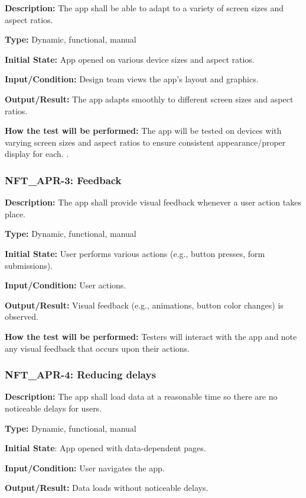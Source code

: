 \documentclass[12pt, titlepage]{article}
\begin{document}
\textbf{Description:} The app shall be able to adapt to a variety of screen sizes and aspect ratios.

\textbf{Type:} Dynamic, functional, manual

\textbf{Initial State:} App opened on various device sizes and aspect ratios.

\textbf{Input/Condition:} Design team views the app's layout and graphics.

\textbf{Output/Result:} The app adapts smoothly to different screen sizes and aspect ratios.

\textbf{How the test will be performed:} The app will be tested on devices with varying screen sizes and aspect ratios to ensure consistent appearance/proper display for each. .


\subsubsection*{\textbf{NFT\_APR-3: Feedback}}


\textbf{Description:} The app shall provide visual feedback whenever a user action takes place.

\textbf{Type: }Dynamic, functional, manual

\textbf{Initial State:} User performs various actions (e.g., button presses, form submissions).

\textbf{Input/Condition: }User actions.

\textbf{Output/Result:} Visual feedback (e.g., animations, button color changes) is observed.

\textbf{How the test will be performed:} Testers will interact with the app and note any visual feedback that occurs upon their actions.


\subsubsection*{\textbf{NFT\_APR-4: Reducing delays}}


\textbf{Description: }The app shall load data at a reasonable time so there are no noticeable delays for users.

\textbf{Type:} Dynamic, functional, manual

\textbf{Initial State}: App opened with data-dependent pages.

\textbf{Input/Condition: }User navigates the app.

\textbf{Output/Result:} Data loads without noticeable delays.
\end{document}
